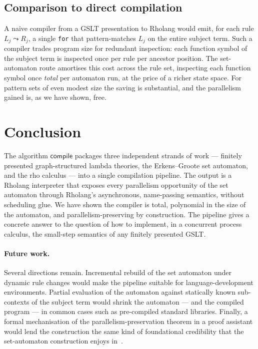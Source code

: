 \documentclass[11pt]{article}
\theoremstyle{plain}
\theoremstyle{definition}
\theoremstyle{remark}
\newcommand{\rew}{\leadsto}
\begin{document}
\subsection{Comparison to direct compilation}

A naive compiler from a GSLT presentation to Rholang would emit, for
each rule $L_j \rew R_j$, a single \texttt{for} that pattern-matches
$L_j$ on the entire subject term. Such a compiler trades program size
for redundant inspection: each function symbol of the subject term is
inspected once per rule per ancestor position. The set-automaton route
amortises this cost across the rule set, inspecting each function
symbol once \emph{total} per automaton run, at the price of a richer
state space. For pattern sets of even modest size the saving is
substantial, and the parallelism gained is, as we have shown, free.

\section{Conclusion}\label{sec:conclusion}

The algorithm $\mathsf{compile}$ packages three independent strands of
work --- finitely presented graph-structured lambda theories, the
Erkens--Groote set automaton, and the rho calculus --- into a single
compilation pipeline. The output is a Rholang interpreter that exposes
every parallelism opportunity of the set automaton through Rholang's
asynchronous, name-passing semantics, without scheduling glue. We have
shown the compiler is total, polynomial in the size of the automaton,
and parallelism-preserving by construction. The pipeline gives a
concrete answer to the question of how to implement, in a concurrent
process calculus, the small-step semantics of any finitely presented
GSLT.

\paragraph{Future work.}
Several directions remain. Incremental rebuild of the set automaton
under dynamic rule changes would make the pipeline suitable for
language-development environments. Partial evaluation of the automaton
against statically known sub-contexts of the subject term would shrink
the automaton --- and the compiled program --- in common cases such as
pre-compiled standard libraries. Finally, a formal mechanisation of the
parallelism-preservation theorem in a proof assistant would lend the
construction the same kind of foundational credibility that the
set-automaton construction enjoys in~\cite{ErkensGroote2021}.
\end{document}

